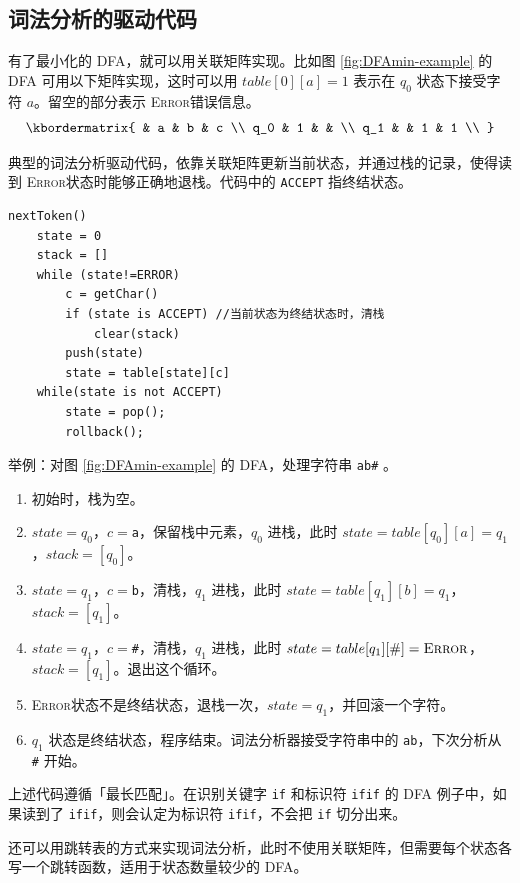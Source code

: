 \documentclass[UTF8]{ctexart}
\newcommand\ERROR{\textsc{Error}}
\begin{document}
\subsection{词法分析的驱动代码}
有了最小化的 DFA，就可以用关联矩阵实现。比如图 \ref{fig:DFAmin-example} 的 DFA 可用以下矩阵实现，这时可以用 $table[0][a]=1$ 表示在 $q_0$ 状态下接受字符 $a$。留空的部分表示 \ERROR 错误信息。
\begin{equation*}
    \kbordermatrix{
          & a & b & c \\
      q_0 & 1 &  & \\
      q_1 &  & 1 & 1 \\
    }
\end{equation*}

典型的词法分析驱动代码，依靠关联矩阵更新当前状态，并通过栈的记录，使得读到 \ERROR 状态时能够正确地退栈。代码中的 \verb!ACCEPT! 指终结状态。
\begin{lstlisting}
nextToken()
    state = 0
    stack = []
    while (state!=ERROR)
        c = getChar()
        if (state is ACCEPT) //当前状态为终结状态时，清栈
            clear(stack)
        push(state)
        state = table[state][c]
    while(state is not ACCEPT)
        state = pop();
        rollback();
\end{lstlisting}

举例：对图 \ref{fig:DFAmin-example} 的 DFA，处理字符串 \verb!ab#! 。
\begin{enumerate}[leftmargin=1.5cm]
    \item 初始时，栈为空。
    \item $state=q_0$，$c=$\verb!a!，保留栈中元素，$q_0$ 进栈，此时 $state=table[q_0][a]=q_1$，$stack=[q_0]$。
    \item $state=q_1$，$c=$\verb!b!，清栈，$q_1$ 进栈，此时 $state = table[q_1][b] = q_1$，$stack=[q_1]$。
    \item $state=q_1$，$c=$\verb!#!，清栈，$q_1$ 进栈，此时 $state = table[q_1][\#] = \ERROR$，$stack=[q_1]$。退出这个循环。
    \item \ERROR 状态不是终结状态，退栈一次，$state=q_1$，并回滚一个字符。
    \item $q_1$ 状态是终结状态，程序结束。词法分析器接受字符串中的 \verb!ab!，下次分析从 \verb!#! 开始。
\end{enumerate}

上述代码遵循「最长匹配」。在识别关键字 \verb!if! 和标识符 \verb!ifif! 的 DFA 例子中，如果读到了 \verb!ifif!，则会认定为标识符 \verb!ifif!，不会把 \verb!if! 切分出来。

还可以用跳转表的方式来实现词法分析，此时不使用关联矩阵，但需要每个状态各写一个跳转函数，适用于状态数量较少的 DFA。
\end{document}
